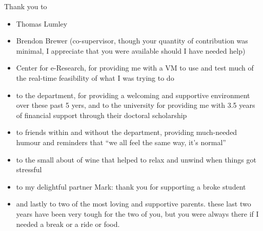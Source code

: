 Thank you to

\begin{itemize}
    \item Thomas Lumley
    \item Brendon Brewer (co-supervisor, though your quantity of contribution was minimal, I appreciate that you were available should I have needed help)

    \item Center for e-Research, for providing me with a VM to use and test much of the real-time feasibility of what I was trying to do

    \item to the department, for providing a welcoming and supportive environment over these past 5 yers, and to the university for providing me with 3.5 years of financial support through their doctoral scholarship

    \item to friends within and without the department, providing much-needed humour and reminders that ``we all feel the same way, it's normal''

    \item to the small about of wine that helped to relax and unwind when things got stressful

    \item to my delightful partner Mark: thank you for supporting a broke student

    \item and lastly to two of the most loving and supportive parents. these last two years have been very tough for the two of you, but you were always there if I needed a break or a ride or food.
\end{itemize}
